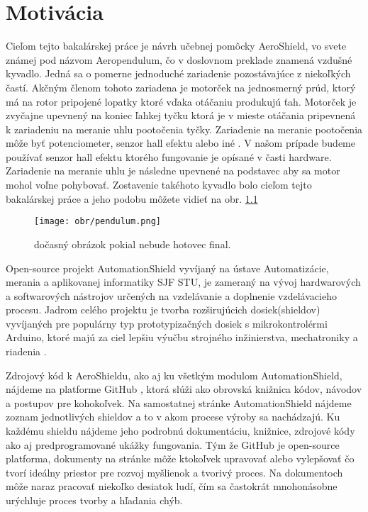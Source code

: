 \chapter{Motivácia}

Cieľom tejto bakalárskej práce je návrh učebnej pomôcky AeroShield, vo svete známej pod názvom Aeropendulum, čo v doslovnom preklade znamená vzdušné kyvadlo. Jedná sa o pomerne jednoduché zariadenie pozostávajúce z niekoľkých častí. Akčným členom tohoto zariadena je  motorček na jednosmerný prúd, ktorý má na rotor pripojené lopatky ktoré vďaka otáčaniu produkujú ťah. Motorček je zvyčajne upevnený na koniec ľahkej tyčku ktorá je v mieste otáčania pripevnená k zariadeniu na meranie uhlu pootočenia tyčky. Zariadenie na meranie pootočenia môže byť potenciometer, senzor hall efektu alebo iné \cite{senzor}. V našom prípade budeme používať senzor hall efektu ktorého fungovanie je opísané v časti hardware. Zariadenie na meranie uhlu je následne upevnené na podstavec aby sa motor mohol voľne pohybovať. Zostavenie takéhoto kyvadlo bolo cieľom tejto bakalárskej práce a jeho podobu môžete vidieť na obr. \ref{OBRAZOK 1.1}

\begin{figure}[!tbh]
\centering
\texttt{[image: obr/pendulum.png]}
\caption{dočasný obrázok pokial nebude hotovec final.}\label{OBRAZOK 1.1}
\end{figure}

Open-source projekt AutomationShield vyvíjaný na ústave Automatizácie, merania a aplikovanej informatiky SJF STU, je zameraný na vývoj hardwarových a softwarových nástrojov určených na vzdelávanie a doplnenie vzdelávacieho procesu. Jadrom celého projektu je tvorba rozširujúcich dosiek(shieldov) vyvíjaných pre populárny typ prototypizačných dosiek s mikrokontrolérmi Arduino, ktoré majú za ciel lepšiu výučbu strojného inžinierstva, mechatroniky a riadenia \cite{Auto}.

Zdrojový kód k AeroShieldu, ako aj ku všetkým modulom AutomationShield, nájdeme na platforme GitHub \cite{Git}, ktorá slúži ako obrovská knižnica kódov, návodov a postupov pre kohokoľvek. Na samostatnej stránke AutomationShield nájdeme zoznam jednotlivých shieldov a to v akom procese výroby sa nachádzajú. Ku každému shieldu nájdeme jeho podrobnú dokumentáciu, knižnice, zdrojové kódy ako aj predprogramované ukážky fungovania. Tým že GitHub je open-source platforma, dokumenty na stránke môže ktokoľvek upravovať alebo vylepšovať čo tvorí ideálny priestor pre rozvoj myšlienok a tvorivý proces. Na dokumentoch môže naraz pracovať niekoľko desiatok ludí, čím sa častokrát mnohonásobne urýchluje proces tvorby a hľadania chýb.

